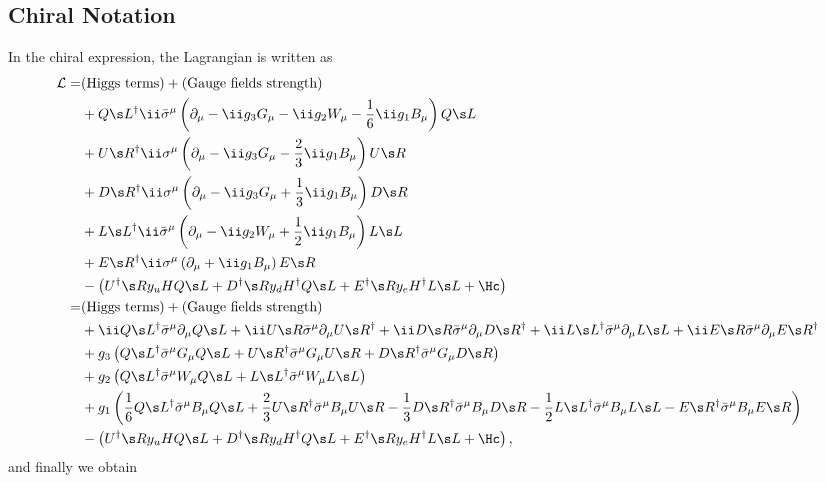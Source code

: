 \subsection{Chiral Notation}
In the chiral expression, the Lagrangian is written as
\begin{align}
 \mathcal L
=& \text{(Higgs terms)} + \text{(Gauge fields strength)}\notag\\
& + Q\s L^\dagger\ii\bar\sigma^\mu\left(\partial_\mu-\ii g_3G_\mu-\ii
 g_2W_\mu-\frac16\ii g_1B_\mu\right)Q\s L\notag\\
& + U\s R^\dagger\ii\sigma^\mu\left(\partial_\mu-\ii g_3G_\mu-\frac23\ii g_1B_\mu\right)U\s R\notag\\
& + D\s R^\dagger\ii\sigma^\mu\left(\partial_\mu-\ii g_3G_\mu+\frac13\ii g_1B_\mu\right)D\s R\notag\\
& + L\s L^\dagger\ii\bar\sigma^\mu\left(\partial_\mu-\ii g_2W_\mu+\frac12\ii g_1B_\mu\right)L\s L\notag\\
& + E\s R^\dagger\ii\sigma^\mu\left(\partial_\mu+\ii g_1B_\mu\right)E\s R\notag\\
& %
 -\left(U^\dagger\s R y_uHQ\s L + D^\dagger\s R y_dH^\dagger Q\s L +
 E^\dagger \s R y_eH^\dagger L\s L + \Hc\right)\notag\\
=& \text{(Higgs terms)} + \text{(Gauge fields strength)}\notag\\
&
+ \ii Q\s L^\dagger\bar\sigma^\mu\partial_\mu Q\s L
+ \ii U\s R        \bar\sigma^\mu\partial_\mu U\s R^\dagger
+ \ii D\s R        \bar\sigma^\mu\partial_\mu D\s R^\dagger
+ \ii L\s L^\dagger\bar\sigma^\mu\partial_\mu L\s L
+ \ii E\s R        \bar\sigma^\mu\partial_\mu E\s R^\dagger \notag\\
&
+ g_3\left(
 Q\s L^\dagger\bar\sigma^\mu G_\mu Q\s L
+U\s R^\dagger\bar\sigma^\mu G_\mu U\s R
+D\s R^\dagger\bar\sigma^\mu G_\mu D\s R
\right)\notag\\
&
+ g_2\left(
 Q\s L^\dagger\bar\sigma^\mu W_\mu Q\s L
+L\s L^\dagger\bar\sigma^\mu W_\mu L\s L
\right)\notag\\
&+ g_1\left(
 \frac16 Q\s L^\dagger\bar\sigma^\mu B_\mu Q\s L
+\frac23 U\s R^\dagger\bar\sigma^\mu B_\mu U\s R
-\frac13 D\s R^\dagger\bar\sigma^\mu B_\mu D\s R
-\frac12 L\s L^\dagger\bar\sigma^\mu B_\mu L\s L
-        E\s R^\dagger\bar\sigma^\mu B_\mu E\s R
\right)\notag\\
& %
 - \left(U^\dagger\s R y_uHQ\s L + D^\dagger\s R y_dH^\dagger Q\s L +
 E^\dagger \s R y_eH^\dagger L\s L + \Hc\right),
\end{align}
and finally we obtain
